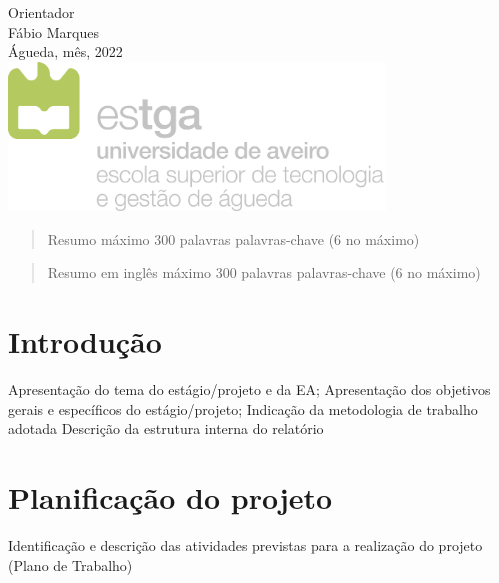 \documentclass[12pt, twoside]{report}
\begin{document}
\begin{titlepage}
		\vspace{1cm}
		Orientador\\
		Fábio Marques\\
		
		\vspace{3cm}
		\large
		Águeda, mês, 2022 \\
		
		\vspace{2cm}
		\centering
		\includegraphics[width=10cm]{image/AssB_vertical_cor}
		
	\end{titlepage}

	\begin{abstract}
	\setlength{\parskip}{14pt}
	\setlength{\parindent}{0pt}
	
	
	Resumo máximo 300 palavras
	palavras-chave (6 no máximo)
	\end{abstract}
	
	\begin{abstract}
		Resumo em inglês máximo 300 palavras
		palavras-chave (6 no máximo)
	\end{abstract}

	\newpage
	\setcounter{page}{1} %
	\tableofcontents %
	\thispagestyle{plain} %
	\thispagestyle{empty} %
	\newpage
	\listoftables %
	\newpage
	\listoffigures %
	
	
	\newpage
	

	\chapter{Introdução}
	\setlength{\parskip}{14pt}
	\setlength{\parindent}{0pt}
Apresentação do tema do estágio/projeto e da EA;
Apresentação dos objetivos gerais e específicos do estágio/projeto;
Indicação da metodologia de trabalho adotada
Descrição da estrutura interna do relatório

	
	\chapter{Planificação do projeto}
	Identificação e descrição das atividades previstas para a realização
	do projeto (Plano de Trabalho)
\end{document}

